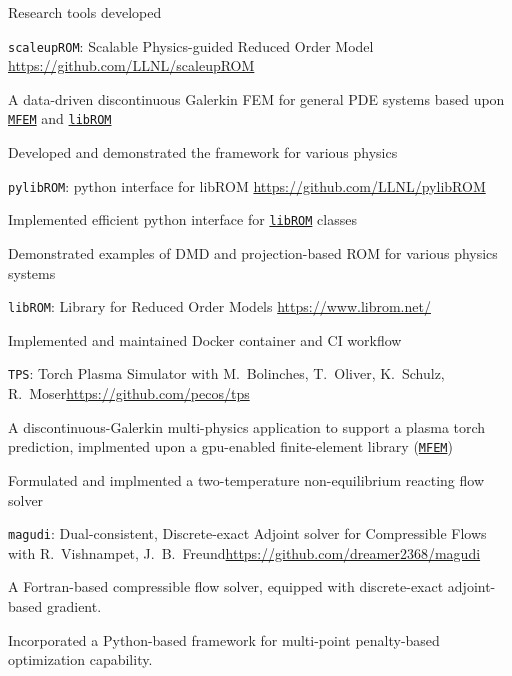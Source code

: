 \documentclass{resume} %
\begin{document}
\begin{rSection}{Research tools developed}
\begin{rSubsection}{\texttt{scaleupROM}: Scalable Physics-guided Reduced Order Model}{}
{ }{\url{https://github.com/LLNL/scaleupROM}}
\item A data-driven discontinuous Galerkin FEM for general PDE systems
based upon \href{https://mfem.org}{\texttt{MFEM}} and \href{https://www.librom.net}{\texttt{libROM}}
\item Developed and demonstrated the framework for various physics
\end{rSubsection}
\begin{rSubsection}{\texttt{pylibROM}: python interface for libROM}{}
{ }{\url{https://github.com/LLNL/pylibROM}}
\item Implemented efficient python interface for \href{https://www.librom.net}{\texttt{libROM}} classes
\item Demonstrated examples of DMD and projection-based ROM for various physics systems
\end{rSubsection}
\begin{rSubsection}{\texttt{libROM}: Library for Reduced Order Models}{}
{ }{\url{https://www.librom.net/}}
\item Implemented and maintained Docker container and CI workflow
\end{rSubsection}
\begin{rSubsection}{\texttt{TPS}: Torch Plasma Simulator}{}
{with M.\ Bolinches, T.\ Oliver, K.\ Schulz, R.\ Moser}{\url{https://github.com/pecos/tps}}
\item A discontinuous-Galerkin multi-physics application to support a plasma torch prediction,
implmented upon a gpu-enabled finite-element library (\href{https://mfem.org}{\texttt{MFEM}})
\item Formulated and implmented a two-temperature non-equilibrium reacting flow solver
\end{rSubsection}
\begin{rSubsection}{\texttt{magudi}: Dual-consistent, Discrete-exact Adjoint solver for Compressible Flows}{}
{with R.\ Vishnampet, J.\ B.\ Freund}{\url{https://github.com/dreamer2368/magudi}}
\item A Fortran-based compressible flow solver, equipped with discrete-exact adjoint-based gradient.
\item Incorporated a Python-based framework for multi-point penalty-based optimization capability.
\end{rSubsection}

\end{rSection}
\end{document}
